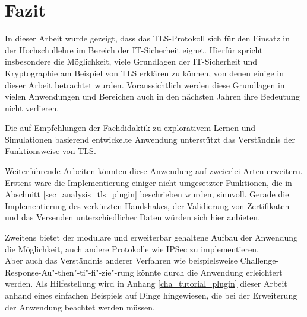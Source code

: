 \chapter{Fazit}


In dieser Arbeit wurde gezeigt, dass das TLS-Protokoll sich für den Einsatz in der Hochschullehre im Bereich der IT-Sicherheit eignet. Hierfür spricht insbesondere die Möglichkeit, viele Grundlagen der IT-Sicherheit und Kryptographie am Beispiel von TLS erklären zu können, von denen einige in dieser Arbeit betrachtet wurden. Voraussichtlich werden diese Grundlagen in vielen Anwendungen und Bereichen auch in den nächsten Jahren ihre Bedeutung nicht verlieren.

Die auf Empfehlungen der Fachdidaktik zu explorativem Lernen und Simulationen basierend entwickelte Anwendung unterstützt das Verständnis der Funktionsweise von TLS. 


Weiterführende Arbeiten könnten diese Anwendung auf zweierlei Arten erweitern. Erstens wäre die Implementierung einiger nicht umgesetzter Funktionen, die in Abschnitt \ref{sec_analysis_tls_plugin} beschrieben wurden, sinnvoll. Gerade die Implementierung des verkürzten Handshakes, der Validierung von Zertifikaten und das Versenden unterschiedlicher Daten würden sich hier anbieten.

Zweitens bietet der modulare und erweiterbar gehaltene Aufbau der Anwendung die Möglichkeit, auch andere Protokolle wie IPSec zu implementieren.\\
Aber auch das Verständnis anderer Verfahren wie beispielsweise Challenge-Response-Au"-then"-ti"-fi"-zie"-rung könnte durch die Anwendung erleichtert werden. Als Hilfestellung wird in Anhang \ref{cha_tutorial_plugin} dieser Arbeit anhand eines einfachen Beispiels auf Dinge hingewiesen, die bei der Erweiterung der Anwendung beachtet werden müssen.